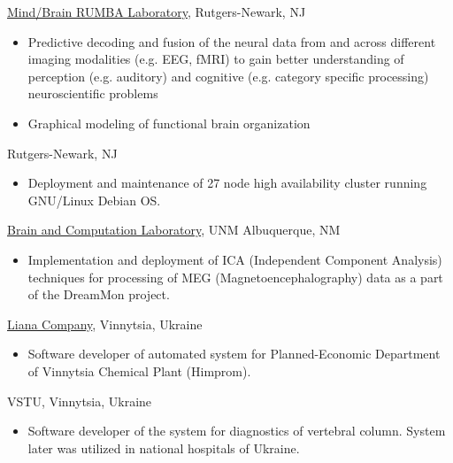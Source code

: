 \documentclass[11pt,letter,roman]{moderncv}
\begin{document}
%
{\href{http://www.rumba.rutgers.edu}{Mind/Brain RUMBA Laboratory}, Rutgers-Newark, NJ
   \begin{itemize}
   \item Predictive decoding and fusion of the neural data from and
     across different imaging modalities (e.g. EEG, fMRI) to gain
     better understanding of perception (e.g. auditory) and cognitive
     (e.g. category specific processing) neuroscientific problems
   \item Graphical modeling of functional brain organization \\
   \end{itemize}}

%
{Rutgers-Newark, NJ
  \begin{itemize}
  \item Deployment and maintenance of 27 node high availability
    cluster running GNU/Linux Debian OS.
  \end{itemize}}

%
{\href{http://www-bcl.cs.unm.edu}{Brain and Computation Laboratory}, UNM Albuquerque, NM
  \begin{itemize}
  \item Implementation and deployment of ICA (Independent Component
   Analysis) techniques for processing of MEG (Magnetoencephalography)
   data as a part of the DreamMon project.
  \end{itemize}}

%
{%
 \href{http://www.webliana.com.ua}{Liana Company}, Vinnytsia, Ukraine
  \begin{itemize}
  \item Software developer of automated system for Planned-Economic
    Department of Vinnytsia Chemical Plant (Himprom).
  \end{itemize}}


%
{VSTU, Vinnytsia, Ukraine
  \begin{itemize}
  \item Software developer of the system for diagnostics of vertebral
    column. System later was utilized in national hospitals of
    Ukraine.
  \end{itemize}}
\end{document}
